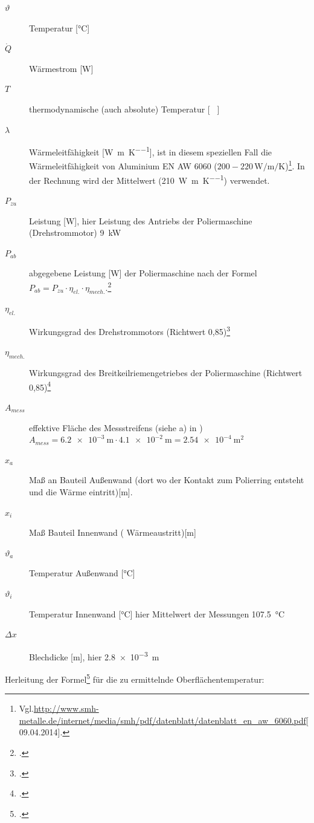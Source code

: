 \documentclass[12pt,a4paper,parskip]{scrartcl}
\begin{document}
\newpage
\begin{description}
\item[ $\vartheta $] Temperatur  [\si{\degreeCelsius}]
\item[$ \dot{Q} $ ] Wärmestrom [\si{\watt}]
\item[$ \si{T}$] thermodynamische (auch absolute) Temperatur [\si{\kelvin
}]
\item[$\lambda $] Wärmeleitfähigkeit [\si{\watt\per\metre\per\kelvin}], ist in diesem speziellen Fall die Wärmeleitfähigkeit von Aluminium EN AW 6060 ($200-220 \, \si{\watt\per\meter\per\kelvin}$)\footnote{Vgl.\url{http://www.smh-metalle.de/internet/media/smh/pdf/datenblatt/datenblatt_en_aw_6060.pdf}[09.04.2014].}. In der Rechnung wird der Mittelwert (\SI{210}{\watt\per\meter\per\kelvin}) verwendet.
\item[$ P_{zu} $] Leistung [\si{\watt}], hier Leistung des Antriebs der Poliermaschine (Drehstrommotor)  \SI{9}{\kilo\watt}
\item[$P_{ab} $]  abgegebene Leistung [\si{\watt}] der Poliermaschine nach der Formel $ P_{ab} = P_{zu} \cdot \eta_{el.} \cdot \eta_{mech.}$.\footcite[Vgl.][R2]{g}
\item[$\eta_{el.} $] Wirkungsgrad des Drehstrommotors (Richtwert 0,85)\footcite[Vgl.][40]{tm}
\item[$\eta_{mech.} $]Wirkungsgrad des Breitkeilriemengetriebes der Poliermaschine (Richtwert 0,85)\footcite[Vgl.][40]{tm}
\item[$A_{mess} $] effektive Fläche des Messstreifens (siehe  a) in ) $ A_{mess} = \SI{6.2e-3}{\meter} \cdot \SI{4.1e-2}{\meter} = \SI{2.54e-4}{\meter\squared}$
\item[$x_a $]  Maß an Bauteil Außenwand (dort wo der Kontakt zum Polierring entsteht und die Wärme eintritt)[\si{\meter}]. 
\item[$x_i$] Maß Bauteil Innenwand ( Wärmeaustritt)[\si{\meter}]
\item[$\vartheta_a$] Temperatur Außenwand [\si{\degreeCelsius}] 
\item[$\vartheta_i$] Temperatur Innenwand [\si{\degreeCelsius}] hier Mittelwert der Messungen \SI{107.5}{\degreeCelsius} 
\item[$ \Delta x $] Blechdicke [\si{\meter}], hier \SI{2.8e-3}{\meter}

\end{description}

Herleitung der Formel\footcite[Vgl.][18-19]{wae} für die zu ermittelnde Oberflächentemperatur:
\end{document}
